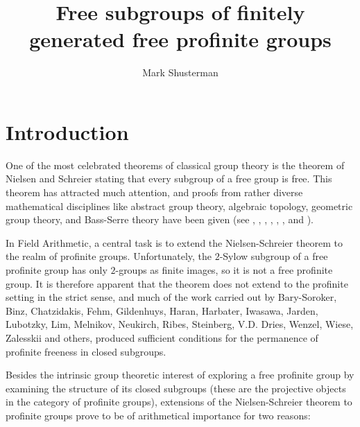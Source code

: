\documentclass[12pt,a4paper]{article}
\author{Mark Shusterman}
\title{Free subgroups of finitely \\generated free profinite groups}
\begin{document}
\maketitle


\section{Introduction}

One of the most celebrated theorems of classical group theory is the theorem of Nielsen and Schreier stating that every subgroup of a free group is free. This theorem has attracted much attention, and proofs from rather diverse mathematical disciplines like abstract group theory, algebraic topology, geometric group theory, and Bass-Serre theory have been given (see \cite{DHLS}, \cite[Proposition 17.5.6]{FJ}, \mbox{\cite[Chapter 14]{Hig}}, \cite{How}, \cite[pp. 383-387]{Rot}, \cite{RS}, and \cite[Chapter 2]{SW}).

In Field Arithmetic, a central task is to extend the Nielsen-Schreier theorem to the realm of profinite groups. Unfortunately, the $2$-Sylow subgroup of a free profinite group has only $2$-groups as finite images, so it is not a free profinite group. It is therefore apparent that the theorem does not extend to the profinite setting in the strict sense, and much of the work carried out by  Bary-Soroker,  Binz, Chatzidakis, Fehm, Gildenhuys, Haran, Harbater, Iwasawa, Jarden, Lubotzky, Lim, Melnikov, Neukirch, Ribes, Steinberg, V.D. Dries, Wenzel, Wiese, Zalesskii and others, produced sufficient conditions for the permanence of profinite freeness in closed subgroups.

Besides the intrinsic group theoretic interest of exploring a free profinite group by examining the structure of its closed subgroups (these are the projective objects in the category of profinite groups), extensions of the Nielsen-Schreier theorem to profinite groups prove to be of arithmetical importance for two reasons:
\end{document}
